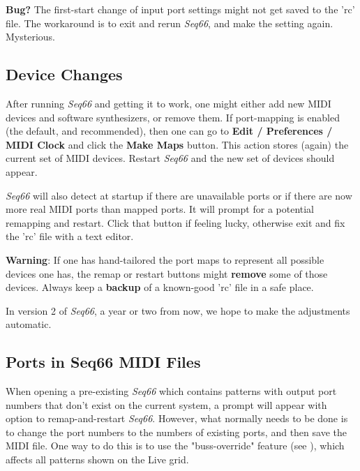    \textbf{Bug?}
      The first-start change of input port settings might not get saved
      to the 'rc' file. The workaround is to exit and rerun
      \textsl{Seq66}, and make the setting again.
      Mysterious.

\subsection{Device Changes}
\label{subsec:introduction_device_changes}

   After running \textsl{Seq66} and getting it to work, one might
   either add new MIDI devices and software synthesizers, or remove
   them.
   If port-mapping is enabled (the default, and recommended), then
   one can go to
   \textbf{Edit / Preferences / MIDI Clock} and
   click the \textbf{Make Maps} button.
   This action stores (again) the current set of MIDI devices.
   Restart \textsl{Seq66} and the new set of devices should appear.

   \textsl{Seq66} will also detect at startup if there are unavailable
   ports or if there are now more real MIDI ports than mapped ports.
   It will prompt for a potential remapping and restart.
   Click that button if feeling lucky, otherwise
   exit and fix the 'rc' file with a text editor.

   \textbf{Warning}:
   If one has hand-tailored the port maps to represent all possible devices one
   has, the remap or restart buttons might \textbf{remove}
   some of those devices.
   Always keep a \textbf{backup}
   of a known-good 'rc' file in a safe place.

   In version 2 of \textsl{Seq66}, a year or two from now, we hope to make
   the adjustments automatic.

\subsection{Ports in Seq66 MIDI Files}
\label{subsec:introduction_ports}

   When opening a pre-existing \textsl{Seq66} which contains patterns with
   output port numbers that don't exist on the current system, a prompt
   will appear with option to remap-and-restart \textsl{Seq66}.
   However, what normally needs to be done is to change the
   port numbers to the numbers of existing ports, and then save the MIDI file.
   One way to do this is to use the "buss-override" feature
   (see ),
   which affects all patterns shown on the Live grid.

